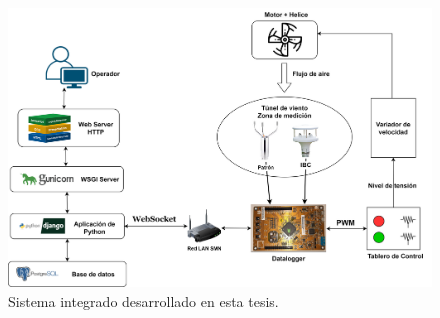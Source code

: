 \begin{figure}[H]
    \centering
    \includegraphics[width=1.1\linewidth]{Figuras/AplicacionWeb/integracionHardware/DiagramaSistemaDesarrollar.png}
    \caption{Sistema integrado desarrollado en esta tesis.}
    \label{fig:sistemaIntegral}
\end{figure}



